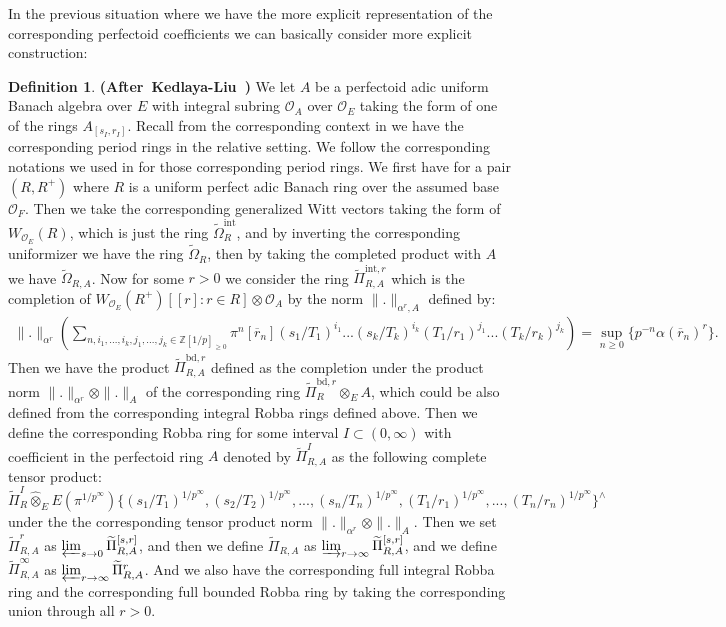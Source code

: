 \documentclass[12pt]{amsart}
\theoremstyle{definition}
\newtheorem{definition}[theorem]{Definition}
\numberwithin{equation}{section}
\begin{document}
\indent In the previous situation where we have the more explicit representation of the corresponding perfectoid coefficients we can basically consider more explicit construction:


\begin{definition}\mbox{\bf{(After Kedlaya-Liu \cite[Definition 4.1.1]{KL2})}}
We let $A$ be a perfectoid adic uniform Banach algebra over $E$ with integral subring $\mathcal{O}_A$ over $\mathcal{O}_E$ taking the form of one of the rings $A_{[s_I,r_I]}$. Recall from the corresponding context in \cite{KL1} we have the corresponding period rings in the relative setting. We follow the corresponding notations we used in \cite[Section 2.1]{T2} for those corresponding period rings. We first have for a pair $(R,R^+)$ where $R$ is a uniform perfect adic Banach ring over the assumed base $\mathcal{O}_F$. Then we take the corresponding generalized Witt vectors taking the form of $W_{\mathcal{O}_E}(R)$, which is just the ring $\widetilde{\Omega}_R^\mathrm{int}$, and by inverting the corresponding uniformizer we have the ring $\widetilde{\Omega}_R$, then by taking the completed product with $A$ we have $\widetilde{\Omega}_{R,A}$. Now for some $r>0$ we consider the ring $\widetilde{\Pi}^{\mathrm{int},r}_{R,A}$ which is the completion of $W_{\mathcal{O}_E}(R^+)[[r]:r\in R]\otimes \mathcal{O}_A $ by the norm $\|.\|_{\alpha^r,A}$ defined by:
\begin{align}
\|.\|_{\alpha^r}(\sum_{n,i_1,...,i_k,j_1,...,j_k\in \mathbb{Z}[1/p]_{\geq 0}}\pi^n[\overline{r}_n](s_1/T_1)^{i_1}...(s_k/T_k)^{i_k}(T_1/r_1)^{j_1}...(T_k/r_k)^{j_k})=\sup_{n\geq 0}\{p^{-n}\alpha(\overline{r}_n)^r\}.	
\end{align}
Then we have the product $\widetilde{\Pi}^{\mathrm{bd},r}_{R,A}$ defined as the completion under the product norm $\|.\|_{\alpha^r}\otimes \|.\|_A$ of the corresponding ring $\widetilde{\Pi}^{\mathrm{bd},r}_{R}\otimes_{E}A$, which could be also defined from the corresponding integral Robba rings defined above. Then we define the corresponding Robba ring for some interval $I\subset (0,\infty)$ with coefficient in the perfectoid ring $A$ denoted by $\widetilde{\Pi}^{I}_{R,A}$ as the following complete tensor product:
\begin{displaymath}
\widetilde{\Pi}^{I}_{R}\widehat{\otimes}_{E} E(\pi^{1/p^\infty})\{(s_1/T_1)^{1/p^\infty},(s_2/T_2)^{1/p^\infty},...,(s_n/T_n)^{1/p^\infty},(T_1/r_1)^{1/p^\infty},...,(T_n/r_n)^{1/p^\infty}\}^\wedge	
\end{displaymath}
under the the corresponding tensor product norm $\|.\|_{\alpha^r}\otimes \|.\|_A$. Then we set $\widetilde{\Pi}^r_{R,A}$ as $\varprojlim_{s\rightarrow 0}\widetilde{\Pi}^{[s,r]}_{R,A}$, and then we define $\widetilde{\Pi}_{R,A}$ as $\varinjlim_{r\rightarrow \infty}\widetilde{\Pi}^{[s,r]}_{R,A}$, and we define $\widetilde{\Pi}^\infty_{R,A}$ as $\varprojlim_{r\rightarrow \infty}\widetilde{\Pi}^{r}_{R,A}$. And we also have the corresponding full integral Robba ring and the corresponding full bounded Robba ring by taking the corresponding union through all $r>0$.\\
\end{definition}
\end{document}
